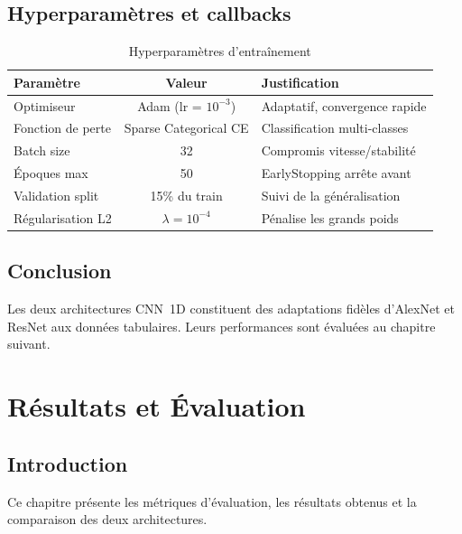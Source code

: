 \documentclass[12pt,a4paper]{report}
\begin{document}
\section{Hyperparamètres et callbacks}

\begin{table}[H]
\centering
\begin{tabular}{|l|c|l|}
\hline
\rowcolor{bleu!15}
\textbf{Param\`{e}tre} & \textbf{Valeur} & \textbf{Justification} \\
\hline
Optimiseur & Adam (lr = $10^{-3}$) & Adaptatif, convergence rapide \\
\hline
Fonction de perte & Sparse Categorical CE & Classification multi-classes \\
\hline
Batch size & 32 & Compromis vitesse/stabilit\'{e} \\
\hline
\'{E}poques max & 50 & EarlyStopping arr\^{e}te avant \\
\hline
Validation split & 15\% du train & Suivi de la g\'{e}n\'{e}ralisation \\
\hline
R\'{e}gularisation L2 & $\lambda = 10^{-4}$ & P\'{e}nalise les grands poids \\
\hline
\end{tabular}
\caption{Hyperparam\`{e}tres d'entra\^{i}nement}
\label{tab:hyperparams}
\end{table}

\section{Conclusion}

Les deux architectures CNN~1D constituent des adaptations fid\`{e}les d'AlexNet et ResNet aux donn\'{e}es tabulaires. Leurs performances sont \'{e}valu\'{e}es au chapitre suivant.

\chapter{R\'{e}sultats et \'{E}valuation}

\section{Introduction}

Ce chapitre pr\'{e}sente les m\'{e}triques d'\'{e}valuation, les r\'{e}sultats obtenus et la comparaison des deux architectures.
\end{document}
